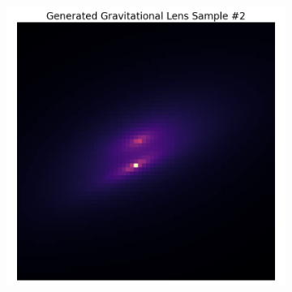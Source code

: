 \documentclass[12pt]{article}
\begin{document}
\begin{figure}[thb]
\begin{minipage}{\columnwidth}
\begin{subfigure}{0.5\columnwidth}
    \includegraphics[width=\columnwidth]{../figures/img2.jpg}
    \caption{}
    \label{fig:sample2}
    \end{subfigure}
\end{minipage}


\end{figure}
\end{document}
